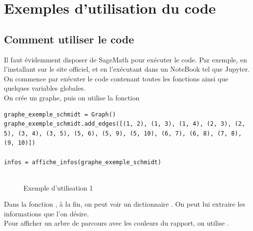 \documentclass{article}      %
\begin{document}
\section{Exemples d'utilisation du code}
\subsection{Comment utiliser le code}
Il faut évidemment disposer de SageMath pour exécuter le code.
Par exemple, en l'installant sur le site officiel, et en l'exécutant dans un NoteBook tel que Jupyter.
%
\\ On commence par exécuter le code contenant toutes les fonctions ainsi que quelques variables globales.
%
\\ On crée un graphe, puis on utilise la fonction 

\begin{lstlisting}[style=code-style]
graphe_exemple_schmidt = Graph()
graphe_exemple_schmidt.add_edges([(1, 2), (1, 3), (1, 4), (2, 3), (2, 5), (3, 4), (3, 5), (5, 6), (5, 9), (5, 10), (6, 7), (6, 8), (7, 8), (9, 10)])

infos = affiche_infos(graphe_exemple_schmidt)
\end{lstlisting}

\begin{figure}[H]
    \centering
    \\Exemple d'utilisation 1
\end{figure}

Dans la fonction , à la fin, on peut voir un dictionnaire .
On peut lui extraire les informations que l'on désire.
%
\\ Pour afficher un arbre de parcours avec les couleurs du rapport, on utilise .
\end{document}
